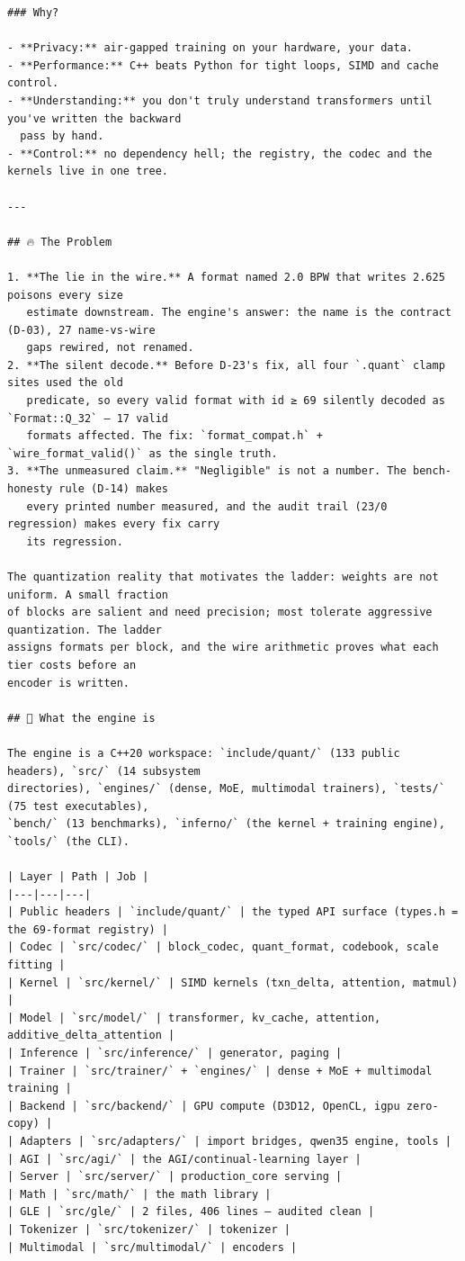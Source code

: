 \begin{Verbatim}[breaklines,breakanywhere,fontsize=\footnotesize]
### Why?

- **Privacy:** air-gapped training on your hardware, your data.
- **Performance:** C++ beats Python for tight loops, SIMD and cache control.
- **Understanding:** you don't truly understand transformers until you've written the backward
  pass by hand.
- **Control:** no dependency hell; the registry, the codec and the kernels live in one tree.

---

## 🔥 The Problem

1. **The lie in the wire.** A format named 2.0 BPW that writes 2.625 poisons every size
   estimate downstream. The engine's answer: the name is the contract (D-03), 27 name-vs-wire
   gaps rewired, not renamed.
2. **The silent decode.** Before D-23's fix, all four `.quant` clamp sites used the old
   predicate, so every valid format with id ≥ 69 silently decoded as `Format::Q_32` — 17 valid
   formats affected. The fix: `format_compat.h` + `wire_format_valid()` as the single truth.
3. **The unmeasured claim.** "Negligible" is not a number. The bench-honesty rule (D-14) makes
   every printed number measured, and the audit trail (23/0 regression) makes every fix carry
   its regression.

The quantization reality that motivates the ladder: weights are not uniform. A small fraction
of blocks are salient and need precision; most tolerate aggressive quantization. The ladder
assigns formats per block, and the wire arithmetic proves what each tier costs before an
encoder is written.

## 🧠 What the engine is

The engine is a C++20 workspace: `include/quant/` (133 public headers), `src/` (14 subsystem
directories), `engines/` (dense, MoE, multimodal trainers), `tests/` (75 test executables),
`bench/` (13 benchmarks), `inferno/` (the kernel + training engine), `tools/` (the CLI).

| Layer | Path | Job |
|---|---|---|
| Public headers | `include/quant/` | the typed API surface (types.h = the 69-format registry) |
| Codec | `src/codec/` | block_codec, quant_format, codebook, scale fitting |
| Kernel | `src/kernel/` | SIMD kernels (txn_delta, attention, matmul) |
| Model | `src/model/` | transformer, kv_cache, attention, additive_delta_attention |
| Inference | `src/inference/` | generator, paging |
| Trainer | `src/trainer/` + `engines/` | dense + MoE + multimodal training |
| Backend | `src/backend/` | GPU compute (D3D12, OpenCL, igpu zero-copy) |
| Adapters | `src/adapters/` | import bridges, qwen35 engine, tools |
| AGI | `src/agi/` | the AGI/continual-learning layer |
| Server | `src/server/` | production_core serving |
| Math | `src/math/` | the math library |
| GLE | `src/gle/` | 2 files, 406 lines — audited clean |
| Tokenizer | `src/tokenizer/` | tokenizer |
| Multimodal | `src/multimodal/` | encoders |


\end{Verbatim}
